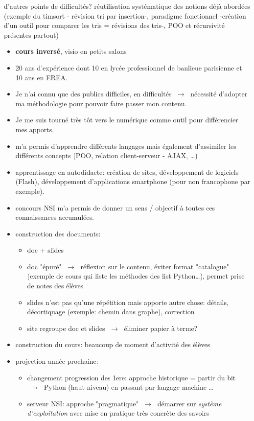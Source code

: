 \documentclass[a4paper,11pt]{article}
\begin{document}
d'autres points de difficultés?
réutilisation systématique des notions déjà abordées (exemple du timsort - révision tri par insertion-, paradigme fonctionnel -création d'un outil pour comparer les tris = révisions des tris-, POO et récursivité présentes partout)
\vspace{10em}
\begin{itemize}
    \item \textbf{cours inversé}, visio en petits salons
    \item 20 ans d'expérience dont 10 en lycée professionnel de banlieue parisienne et 10 ans en EREA.
    \item Je n'ai connu que des publics difficiles, en difficultés $\;\rightarrow\;$ nécessité d'adopter ma méthodologie pour pouvoir faire passer mon contenu.
    \item Je me suis tourné très tôt vers le numérique comme outil pour différencier mes apports.
    \item m'a permis d'apprendre différents langages mais également d'assimiler les différents concepts (POO, relation client-serveur - AJAX, \dots)
    \item apprentissage en autodidacte: création de sites, développement de logiciels (Flash), développement d'applications smartphone (pour non francophone par exemple).
    \item concours NSI m'a permis de donner un sens / objectif à toutes ces connaissances accumulées.
    \item construction des documents:
          \begin{itemize}
              \item doc + slides
              \item doc "épuré" $\;\rightarrow\;$ réflexion sur le contenu, éviter format "catalogue" (exemple de cours qui liste les méthodes des list Python\dots), permet prise de notes des élèves
              \item slides n'est pas qu'une répétition mais apporte autre chose: détails, décortiquage (exemple: chemin dans graphe), correction
              \item site regroupe doc et slides $\;\rightarrow\;$ éliminer papier à terme?
          \end{itemize}
    \item construction du cours: beaucoup de moment d'activité des élèves
    \item projection année prochaine:
    \begin{itemize}
        \item changement progression des 1ere: approche historique = partir du bit $\;\rightarrow\;$ Python (haut-niveau) en passant par langage machine \dots
        \item serveur NSI: approche "pragmatique" $\;\rightarrow\;$ démarrer sur \emph{système d'exploitation} avec mise en pratique très concrète des savoirs
    \end{itemize}
\end{itemize}
\end{document}
